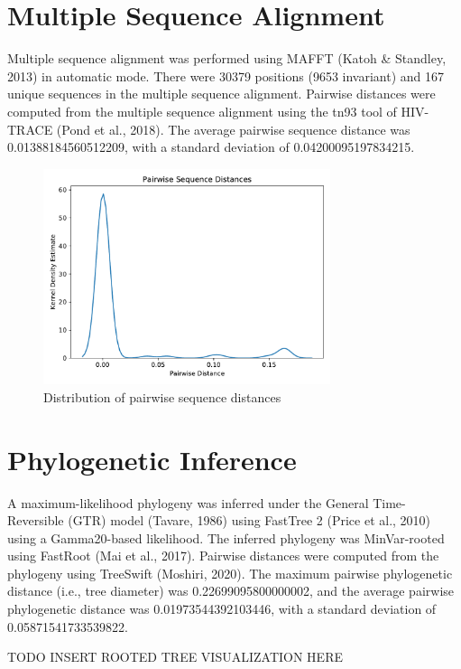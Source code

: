 \documentclass{article}
\begin{document}
\section{Multiple Sequence Alignment}
Multiple sequence alignment was performed using MAFFT (Katoh \& Standley, 2013) in automatic mode.
There were 30379 positions (9653 invariant) and 167 unique sequences in the multiple sequence alignment.
Pairwise distances were computed from the multiple sequence alignment using the tn93 tool of HIV-TRACE (Pond et al., 2018).
The average pairwise sequence distance was 0.01388184560512209,
with a standard deviation of 0.04200095197834215.


\begin{figure}[h]
\centering
\includegraphics[width=0.75\textwidth]{./figs/pairwise_distances_sequences.pdf}
\caption{Distribution of pairwise sequence distances}
\end{figure}

\section{Phylogenetic Inference}
A maximum-likelihood phylogeny was inferred under the General Time-Reversible (GTR) model (Tavare, 1986) using FastTree 2 (Price et al., 2010) using a Gamma20-based likelihood.
The inferred phylogeny was MinVar-rooted using FastRoot (Mai et al., 2017).
Pairwise distances were computed from the phylogeny using TreeSwift (Moshiri, 2020).
The maximum pairwise phylogenetic distance (i.e., tree diameter) was 0.22699095800000002,
and the average pairwise phylogenetic distance was 0.01973544392103446,
with a standard deviation of 0.05871541733539822.


TODO INSERT ROOTED TREE VISUALIZATION HERE
\end{document}
